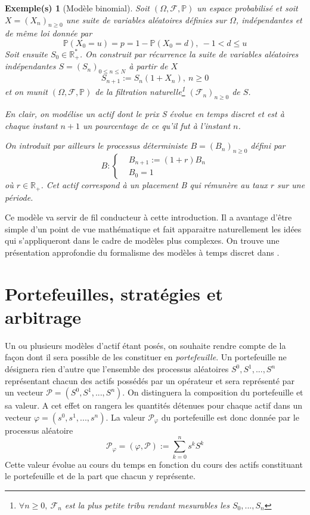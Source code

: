 \documentclass[a4paper]{book}
\newtheorem{ex}{Exemple(s)}[chapter]
\begin{document}
\begin{ex}[Modèle binomial]
    Soit $(\Omega,\mathcal{F},\mathbb{P})$ un espace probabilisé et soit $X=(X_n)_{n\geq 0}$ une suite de variables aléatoires définies sur $\Omega$, indépendantes et de même loi donnée par
    \begin{equation}
        \mathbb{P}(X_0=u)=p=1-\mathbb{P}(X_0=d),\ -1<d\leq u
    \end{equation}
    Soit ensuite $S_0\in\mathbb{R}_+^*$. On construit par récurrence la suite de variables aléatoires indépendantes $S=(S_n)_{0\leq n\leq N}$ à partir de $X$
    \begin{equation}
        S_{n+1}:=S_n (1+X_n),\ n\geq0
    \end{equation}
    et on munit $(\Omega,\mathcal{F},\mathbb{P})$ de la filtration naturelle\footnote{$\forall n\geq 0,\ \mathcal{F}_n$ est la plus petite tribu rendant mesurables les $S_0,...,S_n$} $(\mathcal{F}_n)_{n\geq 0}$ de $S$.

    En clair, on modélise un actif dont le prix \emph{S} évolue en temps discret et est à chaque instant $n+1$ un pourcentage de ce qu'il fut à l'instant $n$.

    On introduit par ailleurs le processus déterministe $B=(B_n)_{n\geq 0}$ défini par
    \[B:\left\lbrace\begin{aligned}
             & B_{n+1}:=(1+r)B_n \\
             & B_0=1
        \end{aligned}
        \right. \]
    où $r\in\mathbb{R}_+$. Cet actif correspond à un placement B qui rémunère au taux $r$ sur une période.
\end{ex}
Ce modèle va servir de fil conducteur à cette introduction. Il a avantage d'être simple d'un point de vue mathématique et fait apparaitre naturellement les idées qui s'appliqueront dans le cadre de modèles plus complexes. On trouve une présentation approfondie du formalisme des modèles à temps discret dans \cite{ICSAF}.


\section{Portefeuilles, stratégies et arbitrage}
Un ou plusieurs modèles d'actif étant posés, on souhaite rendre compte de la façon dont il sera possible de les constituer en \emph{portefeuille}. Un portefeuille ne désignera rien d'autre que l'ensemble des processus aléatoires $S^0,S^1,...,S^n$ représentant chacun des actifs possédés par un opérateur et sera représenté par un vecteur $\mathcal{P}=(S^0,S^1,...,S^n)$. On distinguera la composition du portefeuille et sa valeur. A cet effet on rangera les quantités détenues pour chaque actif dans un vecteur $\varphi = (s^0,s^1,...,s^n)$. La valeur $\mathcal{P}_\varphi$ du portefeuille est donc donnée par le processus aléatoire
\begin{equation}
    \mathcal{P}_\varphi = (\varphi,\mathcal{P}):=\sum_{k=0}^{n}s^kS^k
\end{equation}
Cette valeur évolue au cours du temps en fonction du cours des actifs constituant le portefeuille et de la part que chacun y représente.
\end{document}

